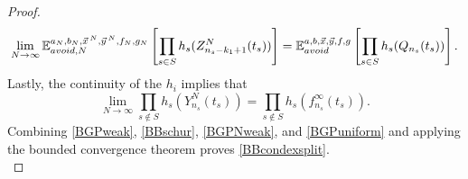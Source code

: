 \begin{proof}
	\begin{equation}\label{BGPNweak}
		\lim_{N\to\infty} \mathbb{E}^{a_N,b_N,\vec{x}\,^N,\vec{y}\,^N,f_N,g_N}_{avoid,N}\left[\prod_{s\in S} h_s(Z^N_{n_s-k_1+1}(t_s))\right] = \mathbb{E}^{a,b,\vec{x},\vec{y},f,g}_{avoid}\left[\prod_{s\in S} h_s(Q_{n_s}(t_s))\right].
	\end{equation}
	Lastly, the continuity of the $h_i$ implies that
	\begin{equation}\label{BGPuniform}
		\lim_{N\to\infty}\prod_{s\notin S} h_s(Y_{n_s}^N(t_s)) = \prod_{s\notin S} h_s(f^\infty_{n_s}(t_s)).
	\end{equation}
	Combining \eqref{BGPweak}, \eqref{BBschur}, \eqref{BGPNweak}, and \eqref{BGPuniform} and applying the bounded convergence theorem proves \eqref{BBcondexsplit}.\\
	

\end{proof}
